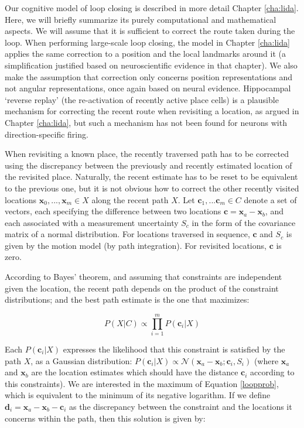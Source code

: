 Our cognitive model of loop closing is described in more detail Chapter \ref{cha:lida}. Here, we will briefly summarize its purely computational and mathematical aspects. We will assume that it is sufficient to correct the route taken during the loop. When performing large-scale loop closing, the model in Chapter \ref{cha:lida} applies the same correction to a position and the local landmarks around it (a simplification justified based on neuroscientific evidence in that chapter). We also make the assumption that correction only concerns position representations and not angular representations, once again based on neural evidence. Hippocampal `reverse replay' \citep{carr2011hippocampal} (the re-activation of recently active place cells) is a plausible mechanism for correcting the recent route when revisiting a location, as argued in Chapter \ref{cha:lida}, but such a mechanism has not been found for neurons with direction-specific firing.

When revisiting a known place, the recently traversed path has to be corrected using the discrepancy between the previously and recently estimated location of the revisited place. Naturally, the recent estimate has to be reset to be equivalent to the previous one, but it is not obvious how to correct the other recently visited locations $\bm x_0, ..., \bm x_m \in X$ along the recent path $X$. Let $\bm c_1, ... \bm c_m \in C$ denote a set of vectors, each specifying the difference between two locations $\bm c=\bm x_a-\bm x_b$, and each associated with a measurement uncertainty $S_c$ in the form of the covariance matrix of a normal distribution. For locations traversed in sequence, $\bm c$ and $S_c$ is given by the motion model (by path integration). For revisited locations, $\bm c$ is zero. 

According to Bayes' theorem, and assuming that constraints are independent given the location, the recent path depends on the product of the constraint distributions; and the best path estimate is the one that maximizes:

\begin{equation}
\label{loopprob}
P(X|C) \propto \prod_{i=1}^{m} P(\bm c_i|X) 
\end{equation}

Each $P(\bm c_i|X)$ expresses the likelihood that this constraint is satisfied by the path $X$, as a Gaussian distribution: $P(\bm c_i|X)\propto\mathcal{N}(\bm x_a-\bm x_b;\bm c_i, S_i)$ (where $\bm x_a$ and $\bm x_b$ are the location estimates which should have the distance $\bm c_i$ according to this constraints). We are interested in the maximum of Equation \ref{loopprob}, which is equivalent to the minimum of its negative logarithm. If we define $\bm d_i=\bm x_a - \bm x_b - \bm c_i$ as the discrepancy between the constraint and the locations it concerns within the path, then this solution is given by:

